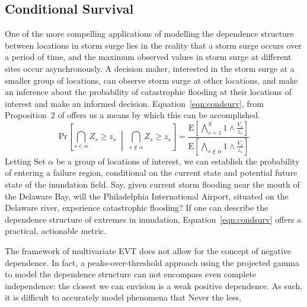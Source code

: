 \subsection{Conditional Survival}
One of the more compelling applications of modelling the dependence structure between locations in 
    storm surge lies in the reality that a storm surge occurs over a period of time, and the 
    maximum observed values in storm surge at different sites occur asynchronously.  A decision maker,
    interested in the storm surge at a smaller group of locations, can observe storm surge at other
    locations, and make an inference about the probability of catastrophic flooding at their locations
    of interest and make an informed decision.
    Equation~\eqref{eqn:condsurv}, from Proposition~2 of \cite{trubey:pg} offers us a means by which 
    this can be accomplished.
    \begin{equation}
        \label{eqn:condsurv}
        \text{Pr}\left[\bigcap_{s\in\alpha}Z_s \geq z_s\;\middle|\;\bigcap_{s\not\in\alpha}Z_s \geq z_s\right] =
        \frac{
            \text{E}\left[\bigwedge_{s=1}^S 1\wedge \frac{V_s}{z_s}\right]
        }{
            \text{E}\left[\bigwedge_{s\not\in\alpha} 1\wedge \frac{V_s}{z_s}\right]
        }
    \end{equation}
    Letting Set $\alpha$ be a group of locations of interest, we can establish the probability of
    entering a failure region, conditional on the current state and potential future state of the inundation 
    field.  Say, given current storm flooding near the mouth of the Delaware Bay, will the Philadelphia 
    International Airport, situated on the Delaware river, experience catastrophic flooding?  If one can 
    describe the dependence structure of extremes in inundation, Equation~\ref{eqn:condsurv} offers a 
    practical, actionable metric.

    
    The framework of multivariate EVT does not allow for the concept of negative dependence.  In fact, 
    a peaks-over-threshold approach using the projected gamma to model the dependence structure can not 
    encompass even complete independence: the closest we can envision is a weak positive dependence.
    As such, it is difficult to accurately model phenomena that 
    Never the less, 

    






